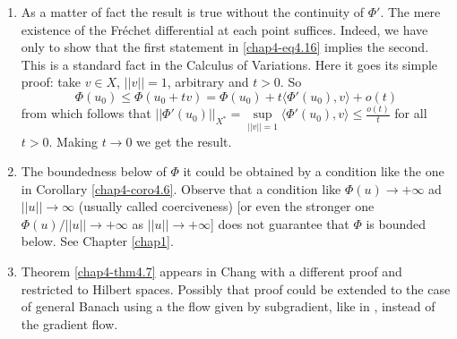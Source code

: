 \begin{remarks*}
\begin{enumerate}
\renewcommand{\labelenumi}{(\theenumi)}
\item As a matter of fact the result is true without the continuity of
  $\Phi'$. The mere existence of the Fr\'echet differential at each
  point suffices. Indeed, we have only to show that the first
  statement in \eqref{chap4-eq4.16} implies the second.\pageoriginale
  This is a standard fact in the Calculus of Variations. Here it goes
  its simple proof: take $v\in X$, $||v||=1$, arbitrary and $t>0$. So
$$
\Phi(u_{0})\leq \Phi(u_{0}+tv)=\Phi(u_{0})+t\langle
\Phi'(u_{0}),v\rangle +o(t)
$$
from which follows that
$||\Phi'(u_{0})||_{X^{*}}=\sup\limits_{||v||=1}\langle
\Phi'(u_{0}),v\rangle\leq \frac{o(t)}{t}$ for all $t>0$. Making $t\to
0$ we get the result. 

\item The boundedness below of $\Phi$ it could be obtained by a
  condition like the one in Corollary \ref{chap4-coro4.6}. Observe
  that a condition like $\Phi(u)\to +\infty$ ad $||u||\to \infty$
  (usually called coerciveness) [or even the stronger one
    $\Phi(u)/||u||\to +\infty$ as $||u||\to +\infty$] does not
  guarantee that $\Phi$ is bounded below. See Chapter \ref{chap1}.

\item Theorem \ref{chap4-thm4.7} appears in Chang \cite{key24} with a
  different proof and restricted to Hilbert spaces. Possibly that
  proof could be extended to the case of general Banach using a the
  flow given by subgradient, like in \cite{key68}, instead of the
  gradient flow.
\end{enumerate}
\end{remarks*}
